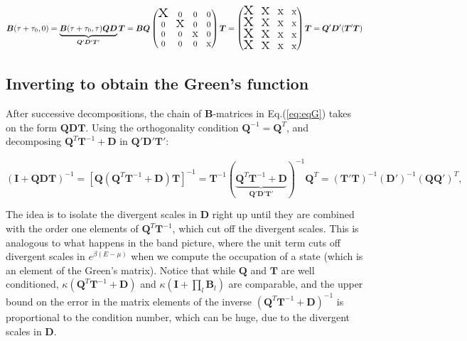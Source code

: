 \begin{equation}
\bm B ( \tau + \tau_0 , 0 ) = \underbrace{\bm B ( \tau + \tau_0, \tau ) \bm Q \bm D}_{\bm Q' \bm D' \bm T'} \bm T = 
\bm B \bm Q \begin{pmatrix}
$$ \mbox{\Huge x} $$ & 0 & 0 & 0 \\
0 & $$ \mbox{\huge x} $$ & 0 & 0 \\
0 & 0 & $$ \mbox{\Large x} $$ & 0 \\ 
0 & 0 & 0 & $$ \mbox{\large x} $$
\end{pmatrix} \bm T = 
\begin{pmatrix}
$$ \mbox{\Huge x} $$ & $$ \mbox{\huge x} $$ & $$ \mbox{\Large x} $$ & $$ \mbox{\large x} $$\\
$$ \mbox{\Huge x} $$ & $$ \mbox{\huge x} $$ & $$ \mbox{\Large x} $$ & $$ \mbox{\large x} $$ \\
$$ \mbox{\Huge x} $$ & $$ \mbox{\huge x} $$ & $$ \mbox{\Large x} $$ & $$ \mbox{\large x} $$ \\ 
$$ \mbox{\Huge x} $$ & $$ \mbox{\huge x} $$ & $$ \mbox{\Large x} $$ & $$ \mbox{\large x} $$
\end{pmatrix} \bm T
=  \bm Q' \bm D' ( \bm T'  \bm T )
\end{equation}

\subsection{Inverting to obtain the Green's function}
\label{subsec:invertToG}

After successive decompositions, the chain of $\bm B$-matrices in Eq.(\ref{eq:eqG}) takes on the form $\bm Q \bm D \bm T$.
Using the orthogonality condition $\bm Q^{-1} = \bm Q^T$, and decomposing $\bm Q^T \bm T^{-1} + \bm D$ in $\bm Q' \bm D' \bm T'$:

\begin{equation}
( \bm I + \bm Q \bm D \bm T )^{-1} = [ \bm Q ( 
\bm Q^T \bm T^{-1} + \bm D ) \bm T ]^{-1} = \bm T^{-1} ( \underbrace{\bm Q^T \bm T^{-1} + \bm D}_{\bm Q' \bm D' \bm T'} )^{-1} \bm Q^T = ( \bm T' \bm T )^{-1} (\bm D')^{-1} (\bm Q \bm Q')^{T} ,
\end{equation}

The idea is to isolate the divergent scales in $\bm D$ right up until they are combined with the order one elements of $\bm Q^T \bm T^{-1}$, which cut off the divergent scales.
This is analogous to what happens in the band picture, where the unit term cuts off divergent scales in $e^{\beta ( E - \mu )}$ when we compute the occupation of a state (which is an element of the Green's matrix).
Notice that while $\bm Q$ and $\bm T$ are well conditioned, $\kappa ( \bm Q^T \bm T^{-1} + \bm D )$ and $\kappa ( \bm I + \prod_l \bm B_l )$ are comparable, and the upper bound on the error in the matrix elements of the inverse $( \bm Q^T \bm T^{-1} + \bm D )^{-1}$ is proportional to the condition number, which can be huge, due to the divergent scales in $\bm D$.


